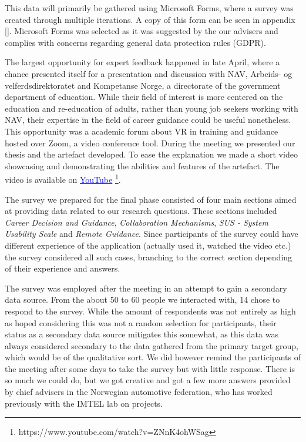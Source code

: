 This data will primarily be gathered using Microsoft Forms, where a survey was created through multiple iterations. A copy of this form can be seen in appendix \ref{}. Microsoft Forms was selected as it was suggested by the our advisers and complies with concerns regarding general data protection rules (GDPR).

The largest opportunity for expert feedback happened in late April, where a chance presented itself for a presentation and discussion with NAV, Arbeids- og velferdsdirektoratet and Kompetanse Norge, a directorate of the government department of education. While their field of interest is more centered on the education and re-education of adults, rather than young job seekers working with NAV, their expertise in the field of career guidance could be useful nonetheless.
This opportunity was a academic forum about VR in training and guidance hosted over Zoom, a video conference tool. During the meeting we presented our thesis and the artefact developed. To ease the explanation we made a short video showcasing and demonstrating the abilities and features of the artefact. The video is available on  \href{https://www.youtube.com/watch?v=ZNnK4ohWSag}{\textcolor{blue}{YouTube}} \footnote{https://www.youtube.com/watch?v=ZNnK4ohWSag}. 

The survey we prepared for the final phase consisted of four main sections aimed at providing data related to our research questions. These sections included \textit{Career Decision and Guidance}, \textit{Collaboration Mechanisms}, \textit{SUS - System Usability Scale} and \textit{Remote Guidance}. Since participants of the survey could have different experience of the application (actually used it, watched the video etc.) the survey considered all such cases, branching to the correct section depending of their experience and answers. 

The survey was employed after the meeting in an attempt to gain a secondary data source. From the about 50 to 60 people we interacted with, 14 chose to respond to the survey. While the amount of respondents was not entirely as high as hoped considering this was not a random selection for participants, their status as a secondary data source mitigates this somewhat, as this data was always considered secondary to the data gathered from the primary target group, which would be of the qualitative sort. We did however remind the participants of the meeting after some days to take the survey but with little response. There is so much we could do, but we got creative and got a few more answers provided by chief advisers in the Norwegian automotive federation, who has worked previously with the IMTEL lab on projects.    




